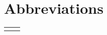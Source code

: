 %
\chapter*{Abbreviations}

\begin{longtable}[l]{@{}ll@{}}
  \endhead
  \endfoot
  
\end{longtable}

%


